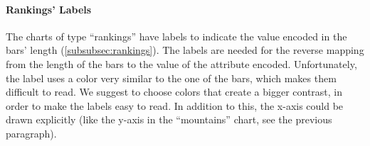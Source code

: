 \paragraph{Rankings' Labels}
The charts of type ``rankings'' have labels to indicate the value encoded in the bars' length (\cref{subsubsec:rankings}).
The labels are needed for the reverse mapping from the length of the bars to the value of the attribute encoded.
Unfortunately, the label uses a color very similar to the one of the bars, which makes them difficult to read.
We suggest to choose colors that create a bigger contrast, in order to make the labels easy to read.
In addition to this, the x-axis could be drawn explicitly (like the y-axis in the ``mountains'' chart, see the previous paragraph).

